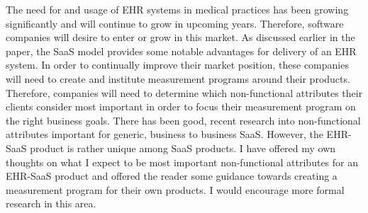 \documentclass[10pt]{article}
\begin{document}
The need for and usage of EHR systems in medical practices has been growing significantly and will continue to grow in upcoming years.
Therefore, software companies will desire to enter or grow in this market.
As discussed earlier in the paper, the SaaS model provides some notable advantages for delivery of an EHR system.
In order to continually improve their market position, these companies will need to create and institute measurement programs around their products.
Therefore, companies will need to determine which non-functional attributes their clients consider most important in order to focus their measurement program on the right business goals.
There has been good, recent research into non-functional attributes important for generic, business to business SaaS.
However, the EHR-SaaS product is rather unique among SaaS products.
I have offered my own thoughts on what I expect to be most important non-functional attributes for an EHR-SaaS product and offered the reader some guidance towards creating a measurement program for their own products.
I would encourage more formal research in this area.



\end{document}
